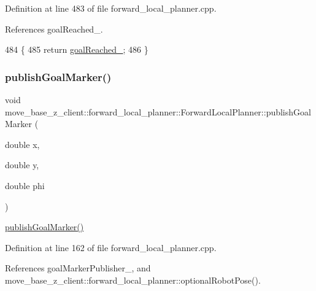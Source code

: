 Definition at line 483 of file forward\+\_\+local\+\_\+planner.\+cpp.



References goal\+Reached\+\_\+.


\begin{DoxyCode}
484 \{
485     \textcolor{keywordflow}{return} \hyperlink{classmove__base__z__client_1_1forward__local__planner_1_1ForwardLocalPlanner_a2c86f8381cc3b8677f95f32ae6939023}{goalReached\_};
486 \}
\end{DoxyCode}
\mbox{\label{classmove__base__z__client_1_1forward__local__planner_1_1ForwardLocalPlanner_a75346bffc10020b4b2af26835039990a}} 
\subsubsection{\texorpdfstring{publish\+Goal\+Marker()}{publishGoalMarker()}}
{\footnotesize\ttfamily void move\+\_\+base\+\_\+z\+\_\+client\+::forward\+\_\+local\+\_\+planner\+::\+Forward\+Local\+Planner\+::publish\+Goal\+Marker (\begin{DoxyParamCaption}\item[{double}]{x,  }\item[{double}]{y,  }\item[{double}]{phi }\end{DoxyParamCaption})\hspace{0.3cm}{\ttfamily [private]}}

\hyperlink{classmove__base__z__client_1_1forward__local__planner_1_1ForwardLocalPlanner_a75346bffc10020b4b2af26835039990a}{publish\+Goal\+Marker()} 

Definition at line 162 of file forward\+\_\+local\+\_\+planner.\+cpp.



References goal\+Marker\+Publisher\+\_\+, and move\+\_\+base\+\_\+z\+\_\+client\+::forward\+\_\+local\+\_\+planner\+::optional\+Robot\+Pose().



